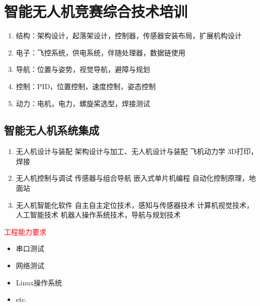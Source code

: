 \section{智能无人机竞赛综合技术培训}

\begin{enumerate}
    \item 结构：架构设计，起落架设计，控制器，传感器安装布局，扩展机构设计
    \item 电子：飞控系统，供电系统，伴随处理器，数据链使用
    \item 导航：位置与姿势，视觉导航，避障与规划
    \item 控制：PID，位置控制，速度控制，姿态控制
    \item 动力：电机，电力，螺旋桨选型，焊接测试
\end{enumerate}

\subsection{智能无人机系统集成}

\begin{enumerate}
    \item 无人机设计与装配
        \subitem  架构设计与加工、无人机设计与装配
        \subitem 飞机动力学
        \subitem 3D打印，焊接
    \item 无人机控制与调试
        \subitem  传感器与组合导航
        \subitem 嵌入式单片机编程
        \subitem 自动化控制原理，地面站
    \item 无人机智能化软件
        \subitem  自主自主定位技术，感知与传感器技术
        \subitem 计算机视觉技术，人工智能技术
        \subitem 机器人操作系统技术，导航与规划技术 
\end{enumerate}

\textcolor{red}{工程能力要求}
\begin{itemize}
    \item 串口测试
    \item 网络测试
    \item Linux操作系统
    \item etc.
\end{itemize}

